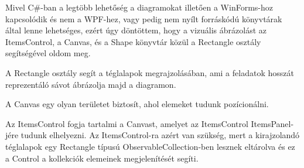 
Mivel C\#-ban a legtöbb lehetőség a diagramokat illetően a WinForms-hoz kapcsolódik és nem a WPF-hez, vagy pedig nem nyílt forráskódú könyvtárak által lenne lehetséges, ezért úgy döntöttem, hogy a vizuális ábrázolást az ItemsControl, a Canvas, és a Shape könyvtár közül a Rectangle osztály segítségével oldom meg.

A Rectangle osztály segít a téglalapok megrajzolásában, ami a feladatok hosszát reprezentáló sávot ábrázolja majd a diagramon.

A Canvas egy olyan területet biztosít, ahol elemeket tudunk pozícionálni.

Az ItemsControl fogja tartalmi a Canvast, amelyet az ItemsControl ItemsPanel-jére tudunk elhelyezni. Az ItemsControl-ra azért van szükség, mert a kirajzolandó téglalapok egy Rectangle típusú ObservableCollection-ben lesznek eltárolva és ez a Control a kollekciók elemeinek megjelenítését segíti.










